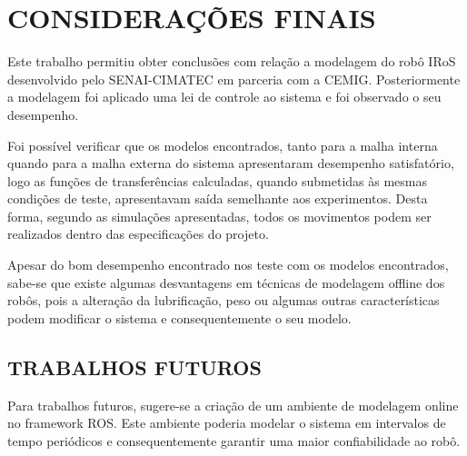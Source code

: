 \documentclass[12pt,oneside,a4paper, chapter=TITLE, section = TITLE, english, brazil]{abntex2}
\begin{document}
\chapter{CONSIDERAÇÕES FINAIS}

Este trabalho permitiu obter conclusões com relação a modelagem do robô IRoS desenvolvido pelo SENAI-CIMATEC em parceria com a CEMIG. Posteriormente a modelagem foi aplicado uma lei de controle ao sistema e foi observado o seu desempenho.

Foi possível verificar que os modelos encontrados, tanto para a malha interna quando para a malha externa do sistema apresentaram desempenho satisfatório, logo as funções de transferências calculadas, quando submetidas às mesmas condições de teste, apresentavam saída semelhante aos experimentos. Desta forma, segundo as simulações apresentadas, todos os movimentos podem ser realizados dentro das especificações do projeto.

Apesar do bom desempenho encontrado nos teste com os modelos encontrados, sabe-se que existe algumas desvantagens em técnicas de modelagem offline dos robôs, pois a alteração da lubrificação, peso  ou algumas outras características podem modificar o sistema e consequentemente o seu modelo.

\section{TRABALHOS FUTUROS}

Para trabalhos futuros, sugere-se a criação de um ambiente de modelagem online no framework ROS. Este ambiente poderia modelar o sistema em intervalos de tempo periódicos e consequentemente garantir uma maior confiabilidade ao robô.

\postextual



%
%






\printindex
\end{document}
